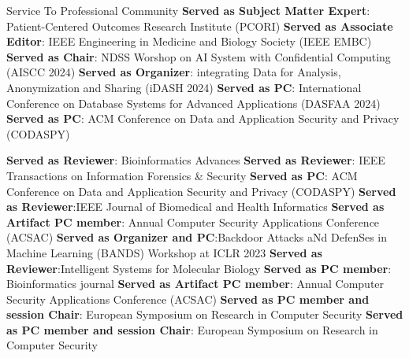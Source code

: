 \begin{rubric}{Service To Professional Community }
\entry*[] \textbf{Served as Subject Matter Expert}:  Patient-Centered Outcomes Research Institute (PCORI)
\entry*[] \textbf{Served as Associate Editor}: IEEE Engineering in Medicine and Biology Society (IEEE EMBC)
\entry*[] \textbf{Served as Chair}:  NDSS Worshop on AI System with Confidential Computing (AISCC 2024)
\entry*[] \textbf{Served as Organizer}:  integrating Data for Analysis, Anonymization and Sharing (iDASH 2024)
\entry*[] \textbf{Served as PC}: International Conference on Database Systems for Advanced Applications (DASFAA 2024)
\entry*[] \textbf{Served as PC}: ACM Conference on Data and Application Security and Privacy (CODASPY)

\entry*[] \textbf{Served as Reviewer}: Bioinformatics Advances
\entry*[] \textbf{Served as Reviewer}: IEEE Transactions on Information Forensics \& Security
\entry*[] \textbf{Served as PC}: ACM Conference on Data and Application Security and Privacy (CODASPY)
\entry*[] \textbf{Served as Reviewer}:IEEE Journal of Biomedical and Health Informatics
\entry*[] \textbf{Served as Artifact PC member}: Annual Computer Security Applications Conference (ACSAC)
\entry*[] \textbf{Served as Organizer and PC}:Backdoor Attacks aNd DefenSes in Machine Learning (BANDS) Workshop at ICLR 2023
\entry*[] \textbf{Served as Reviewer}:Intelligent Systems for Molecular Biology
\entry*[] \textbf{Served as PC member}: Bioinformatics journal
\entry*[] \textbf{Served as Artifact PC member}: Annual Computer Security Applications Conference (ACSAC)
\entry*[] \textbf{Served as PC member and session Chair}: European Symposium on Research in Computer Security
\entry*[] \textbf{Served as PC member and session Chair}: European Symposium on Research in Computer Security



%
%
%
%
%
\end{rubric}




